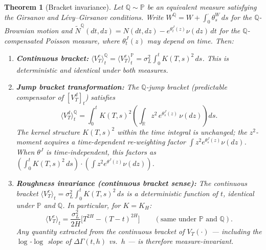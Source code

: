 \documentclass[11pt,a4paper]{article}
\theoremstyle{plain}
\newtheorem{theorem}{Theorem}[section]
\theoremstyle{definition}
\theoremstyle{remark}
\newcommand{\R}{\mathbb{R}}
\newcommand{\PP}{\mathbb{P}}
\newcommand{\QQ}{\mathbb{Q}}
\newcommand{\Ntilde}{\widetilde{N}}
\begin{document}
\begin{theorem}[Bracket invariance]\label{thm:bracket-inv}
Let $\QQ \sim \PP$ be an equivalent measure satisfying the
Girsanov and L\'evy--Girsanov conditions.  Write
$W^\QQ = W + \int_0^\cdot \theta_s^W\,ds$ for the
$\QQ$-Brownian motion and $\Ntilde^\QQ(dt,dz) =
N(dt,dz) - e^{\theta_t^J(z)}\nu(dz)\,dt$ for the $\QQ$-compensated
Poisson measure, where $\theta_t^J(z)$ may depend on time.
Then:
\begin{enumerate}[label=(\alph*)]
\item \textbf{Continuous bracket:}
  $\langle V_T^c \rangle_t^\QQ = \langle V_T^c \rangle_t^\PP
  = \sigma_L^2\int_0^t K(T,s)^2\,ds$.
  This is deterministic and identical under both measures.
\item \textbf{Jump bracket transformation:} The $\QQ$-jump
  bracket (predictable compensator of $[V_T^d]_t$) satisfies
  \begin{equation}\label{eq:jump-bracket-Q}
    \langle V_T^d \rangle_t^\QQ
    = \int_0^t K(T,s)^2
    \left(\int_\R z^2\,e^{\theta_s^J(z)}\,\nu(dz)\right)ds.
  \end{equation}
  The \emph{kernel structure} $K(T,s)^2$ within the time
  integral is unchanged; the $z^2$-moment acquires a
  time-dependent re-weighting factor
  $\int z^2 e^{\theta_s^J(z)}\nu(dz)$.
  When $\theta^J$ is time-independent, this factors as
  $(\int_0^t K(T,s)^2\,ds)\cdot(\int z^2 e^{\theta^J(z)}\nu(dz))$.
\item \textbf{Roughness invariance (continuous bracket sense):}
  The continuous bracket $\langle V_T^c\rangle_t
  = \sigma_L^2\int_0^t K(T,s)^2\,ds$ is a deterministic
  function of $t$, identical under $\PP$ and $\QQ$.
  In particular, for $K = K_H$:
  \begin{equation}\label{eq:H-invariant}
    \langle V_T^c \rangle_t
    = \frac{\sigma_L^2}{2H}
    \bigl[T^{2H} - (T-t)^{2H}\bigr]
    \qquad (\text{same under $\PP$ and $\QQ$}).
  \end{equation}
  Any quantity extracted from the continuous bracket of
  $V_T(\cdot)$ --- including the $\log$-$\log$ slope of
  $\Delta\Gamma(t,h)$ vs.\ $h$ --- is therefore
  measure-invariant.
\end{enumerate}
\end{theorem}
\end{document}
